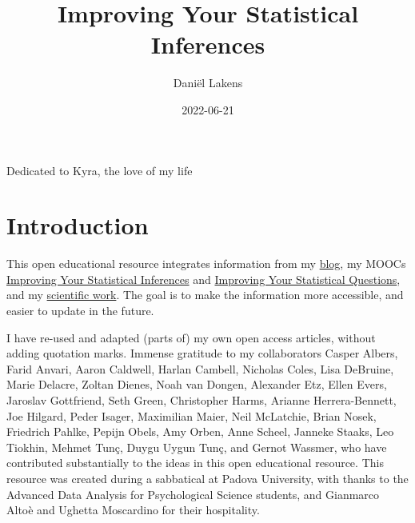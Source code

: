 \documentclass[
  oneside]{krantz}
\title{Improving Your Statistical Inferences}
\author{Daniël Lakens}
\date{2022-06-21}
\begin{document}
\maketitle


\thispagestyle{empty}

\begin{center}
Dedicated to Kyra, the love of my life
\end{center}

\setlength{\abovedisplayskip}{-5pt}
\setlength{\abovedisplayshortskip}{-5pt}

{
\hypersetup{linkcolor=}
\setcounter{tocdepth}{1}
\tableofcontents
}
\listoffigures
\listoftables
\hypertarget{introduction}{%
\chapter*{Introduction}\label{introduction}}


This open educational resource integrates information from my \href{https://daniellakens.blogspot.com/}{blog}, my MOOCs \href{https://www.coursera.org/learn/statistical-inferences}{Improving Your Statistical Inferences} and \href{https://www.coursera.org/learn/improving-statistical-questions}{Improving Your Statistical Questions}, and my \href{https://scholar.google.nl/citations?user=ZbqYyrsAAAAJ\&hl=en}{scientific work}. The goal is to make the information more accessible, and easier to update in the future.

I have re-used and adapted (parts of) my own open access articles, without adding quotation marks. Immense gratitude to my collaborators Casper Albers, Farid Anvari, Aaron Caldwell, Harlan Cambell, Nicholas Coles, Lisa DeBruine, Marie Delacre, Zoltan Dienes, Noah van Dongen, Alexander Etz, Ellen Evers, Jaroslav Gottfriend, Seth Green, Christopher Harms, Arianne Herrera-Bennett, Joe Hilgard, Peder Isager, Maximilian Maier, Neil McLatchie, Brian Nosek, Friedrich Pahlke, Pepijn Obels, Amy Orben, Anne Scheel, Janneke Staaks, Leo Tiokhin, Mehmet Tunç, Duygu Uygun Tunç, and Gernot Wassmer, who have contributed substantially to the ideas in this open educational resource. This resource was created during a sabbatical at Padova University, with thanks to the Advanced Data Analysis for Psychological Science students, and Gianmarco Altoè and Ughetta Moscardino for their hospitality.
\end{document}
